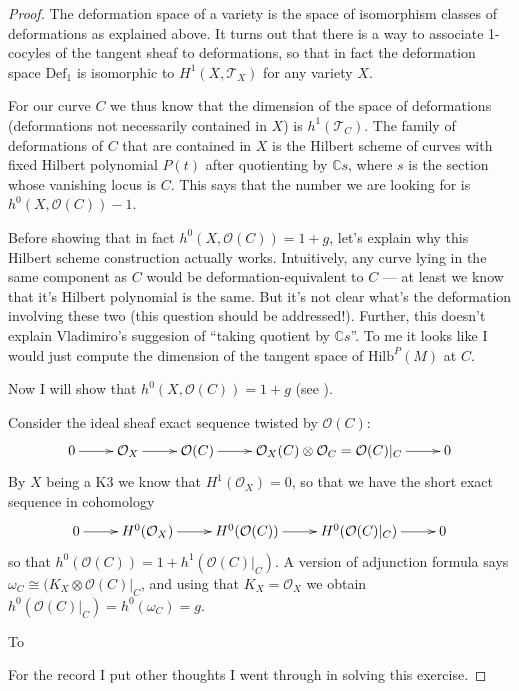 \begin{proof}
The deformation space of a variety is the space of isomorphism classes of
deformations as explained above. It turns out that there is a way to associate
1-cocyles of the tangent sheaf to deformations, so that in fact the deformation
space $\text{Def}_1$ is isomorphic to $H^{1}(X,\mathcal{T}_X)$ for any variety
$X$.

For our curve $C$ we thus know that the dimension of the space of deformations
(deformations not necessarily contained in $X$) is $h^1(\mathcal{T}_C)$.  The
family of deformations of $C$ that are contained in $X$ is the Hilbert scheme of
curves with fixed Hilbert polynomial $P(t)$ after quotienting by $\mathbb{C}s$,
where $s$ is the section whose vanishing locus is  $C$. 
This says that the number we are looking for is $h^{0}(X,\mathcal{O}(C))-1$.

Before showing that in fact $h^0(X,\mathcal{O}(C))=1+g$,
let's explain why this Hilbert scheme construction actually works.
Intuitively, any curve lying in the same component
as $C$ would be deformation-equivalent to $C$
--- at least we know that it's Hilbert polynomial is the same.
But it's not clear what's the deformation involving these two
(this question should be addressed!).
Further, this doesn't explain Vladimiro's
suggesion of ``taking quotient by $\mathbb{C}s$''.
To me it looks like I would just compute the dimension
of the tangent space of $\text{Hilb}^P(M)$ at $C$.

Now I will show that $h^0(X,\mathcal{O}(C))=1+g$ (see 
\cite[Lemma 1.2.1, Remark 1.2.2]{huk}).

Consider the ideal sheaf exact sequence twisted by
$\mathcal{O}(C)$:
$$
\xymatrix{
0\ar[r]&\mathcal{O}_X\ar[r]&\mathcal{O}(C)\ar[r]
&\mathcal{O}_X(C) \otimes \mathcal{O}_C=\mathcal{O}(C)|_{C}\ar[r]&0
}
$$
By $X$ being a K3 we know that $H^{1}(\mathcal{O}_X)=0$, so that we have the
short exact sequence in cohomology
$$
\xymatrix{
0\ar[r]&H^{0}(\mathcal{O}_X)\ar[r]&H^{0}(\mathcal{O}(C))\ar[r]
&H^{0}(\mathcal{O}(C)|_{C})\ar[r]&0
}
$$
so that $h^0(\mathcal{O}(C))=1+h^1(\mathcal{O}(C)|_{C})$. 
A version of adjunction formula says
$\omega_C \cong (K_X \otimes\mathcal{O}(C)|_{C}$, and using that 
$K_X=\mathcal{O}_X$ we obtain $h^0(\mathcal{O}(C)|_{C})=h^0(\omega_C)=g$.

To 

\medskip\noindent
For the record I put other thoughts I went through in solving this exercise.


\end{proof}
